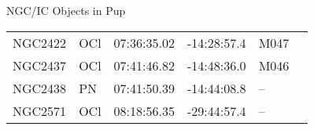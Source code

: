 \begin{block}{NGC/IC Objects in Pup}
  \centering
  \begin{tabularx}{\textwidth}{llrrll} \toprule 
    NGC2422 & OCl & 07:36:35.02 & -14:28:57.4  & M047 \\ 
    NGC2437 & OCl & 07:41:46.82 & -14:48:36.0  & M046 \\ 
    NGC2438 & PN & 07:41:50.39 & -14:44:08.8  & -- \\ 
    NGC2571 & OCl & 08:18:56.35 & -29:44:57.4  & -- \\ 
  \end{tabularx}
\end{block}